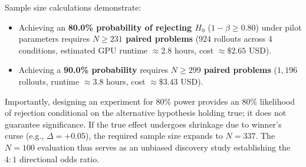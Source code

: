 \documentclass[11pt]{article}
\begin{document}
Sample size calculations demonstrate:
\begin{itemize}
    \item Achieving an \textbf{80.0\% probability of rejecting $H_0$} ($1 - \beta \ge 0.80$) under pilot parameters requires \textbf{$N \ge 231$ paired problems} ($924$ rollouts across 4 conditions, estimated GPU runtime $\approx 2.8$ hours, cost $\approx \$2.65$ USD).
    \item Achieving a \textbf{90.0\% probability} requires \textbf{$N \ge 299$ paired problems} ($1,196$ rollouts, runtime $\approx 3.8$ hours, cost $\approx \$3.43$ USD).
\end{itemize}
Importantly, designing an experiment for $80\%$ power provides an $80\%$ likelihood of rejection conditional on the alternative hypothesis holding true; it does not guarantee significance. If the true effect undergoes shrinkage due to winner's curse (e.g., $\Delta = +0.05$), the required sample size expands to $N = 337$. The $N=100$ evaluation thus serves as an unbiased discovery study establishing the $4:1$ directional odds ratio.
\end{document}
